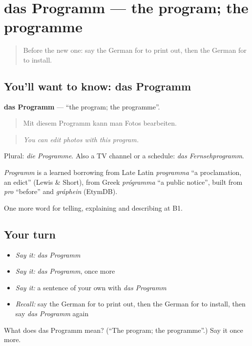 \section[das Programm]{das Programm — the program; the programme}

\label{lesson:GE-C396-programm}



\begin{quote}
Before the new one: say the German for to print out, then the German for to install.
\end{quote}

\subsection*{You'll want to know: das Programm}
\textbf{das Programm} — \textquotedblleft{}the program; the programme\textquotedblright{}.

\begin{quote}
Mit diesem Programm kann man Fotos bearbeiten.
\end{quote}

\begin{quote}
\emph{You can edit photos with this program.}
\end{quote}

Plural: \emph{die Programme}. Also a TV channel or a schedule: \emph{das Fernsehprogramm}.

\begin{cousinweb}
\emph{Programm} is a learned borrowing from Late Latin \emph{programma} \textquotedblleft{}a proclamation, an edict\textquotedblright{} (Lewis \& Short), from Greek \emph{prógramma} \textquotedblleft{}a public notice\textquotedblright{}, built from \emph{pro} \textquotedblleft{}before\textquotedblright{} and \emph{gráphein} (EtymDB).
\end{cousinweb}

\begin{grammarlens}[title={What you've built}]
One more word for telling, explaining and describing at B1.
\end{grammarlens}

\subsection*{Your turn}
\begin{itemize}
\raggedright
  \item \emph{Say it:} \emph{das Programm}
  \item \emph{Say it:} \emph{das Programm}, once more
  \item \emph{Say it:} a sentence of your own with \emph{das Programm}
  \item \emph{Recall:} say the German for to print out, then the German for to install, then say \emph{das Programm} again
\end{itemize}

\begin{tcolorbox}[breakable,colback=teal!4,colframe=teal!35!black,title={Before you move on}]
What does das Programm mean? (\textquotedblleft{}The program; the programme\textquotedblright{}.) Say it once more.
\end{tcolorbox}
